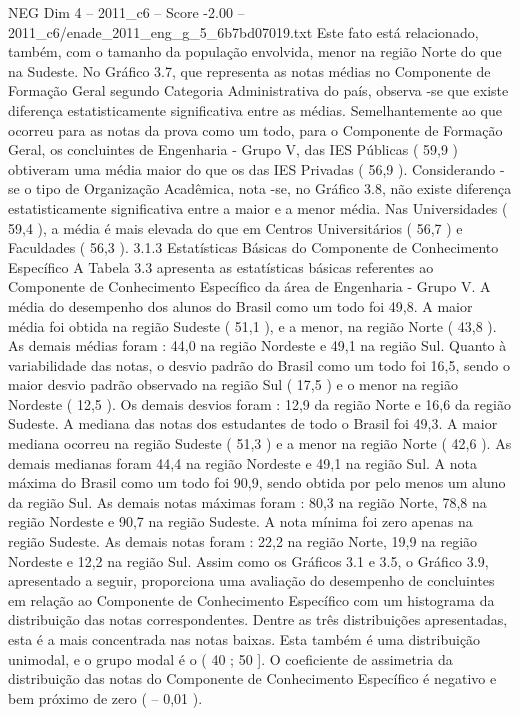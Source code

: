 \begin{textsample}{NEG Dim 4 – 2011\_c6 – Score -2.00 – 2011\_c6/enade\_2011\_eng\_g\_5\_6b7bd07019.txt}
Este fato está relacionado, também, com o tamanho da população envolvida, menor na região Norte do que na Sudeste.
No Gráfico 3.7, que representa as notas médias no Componente de Formação Geral segundo Categoria Administrativa do país, observa -se que existe diferença estatisticamente significativa entre as médias.
Semelhantemente ao que ocorreu para as notas da prova como um todo, para o Componente de Formação Geral, os concluintes de Engenharia - Grupo V, das IES Públicas ( 59,9 ) obtiveram uma média maior do que os das IES Privadas ( 56,9 ).
Considerando -se o tipo de Organização Acadêmica, nota -se, no Gráfico 3.8, não existe diferença estatisticamente significativa entre a maior e a menor média.
Nas Universidades ( 59,4 ), a média é mais elevada do que em Centros Universitários ( 56,7 ) e Faculdades ( 56,3 ). 3.1.3 Estatísticas Básicas do Componente de Conhecimento Específico A Tabela 3.3 apresenta as estatísticas básicas referentes ao Componente de Conhecimento Específico da área de Engenharia - Grupo V.
A média do desempenho dos alunos do Brasil como um todo foi 49,8.
A maior média foi obtida na região Sudeste ( 51,1 ), e a menor, na região Norte ( 43,8 ).
As demais médias foram : 44,0 na região Nordeste e 49,1 na região Sul.
Quanto à variabilidade das notas, o desvio padrão do Brasil como um todo foi 16,5, sendo o maior desvio padrão observado na região Sul ( 17,5 ) e o menor na região Nordeste ( 12,5 ).
Os demais desvios foram : 12,9 da região Norte e 16,6 da região Sudeste.
A mediana das notas dos estudantes de todo o Brasil foi 49,3.
A maior mediana ocorreu na região Sudeste ( 51,3 ) e a menor na região Norte ( 42,6 ).
As demais medianas foram 44,4 na região Nordeste e 49,1 na região Sul.
A nota máxima do Brasil como um todo foi 90,9, sendo obtida por pelo menos um aluno da região Sul.
As demais notas máximas foram : 80,3 na região Norte, 78,8 na região Nordeste e 90,7 na região Sudeste.
A nota mínima foi zero apenas na região Sudeste.
As demais notas foram : 22,2 na região Norte, 19,9 na região Nordeste e 12,2 na região Sul.
Assim como os Gráficos 3.1 e 3.5, o Gráfico 3.9, apresentado a seguir, proporciona uma avaliação do desempenho de concluintes em relação ao Componente de Conhecimento Específico com um histograma da distribuição das notas correspondentes.
Dentre as três distribuições apresentadas, esta é a mais concentrada nas notas baixas.
Esta também é uma distribuição unimodal, e o grupo modal é o ( 40 ; 50 ].
O coeficiente de assimetria da distribuição das notas do Componente de Conhecimento Específico é negativo e bem próximo de zero ( – 0,01 ).

\end{textsample}
